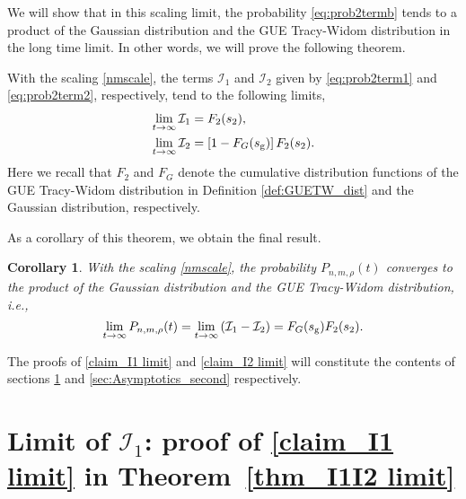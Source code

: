 \documentclass[cmp]{svjour}
\numberwithin{theorem}{section}
\numberwithin{equation}{section}
\newtheorem{corollaryn}[theorem]{Corollary}
\begin{document}
We will show that in this scaling limit, the probability \eqref{eq:prob2termb} tends to a product of the Gaussian distribution and the GUE Tracy-Widom distribution in the long time limit. In other words, we will prove the following theorem.

\medskip

\begin{theorem}
\label{thm_I1I2 limit}
With the scaling \eqref{nmscale}, the terms $\mathcal{I}_1$ and $\mathcal{I}_2$ given by \eqref{eq:prob2term1} and \eqref{eq:prob2term2}, respectively, tend to the following limits,
\begin{subequations}
\begin{align}
\lim_{t \to \infty} \mathcal{I}_1 & = F_2(s_{2}), \label{claim_I1 limit} \\
\lim_{t \to \infty} \mathcal{I}_2 & = \left[ 1 - F_G(s_{{\rm g}}) \right] F_2(s_{2}). \label{claim_I2 limit} 
\end{align}
\end{subequations}
Here we recall that $F_2$ and $F_G$ denote the cumulative distribution functions of the GUE Tracy-Widom distribution in Definition \ref{def:GUETW_dist} and the Gaussian distribution, respectively.
\end{theorem}
As a corollary of this theorem, we obtain the final result.

\medskip

\begin{corollaryn}
\label{cor_Pnm limit}
With the scaling \eqref{nmscale}, the probability $P_{n,m,\rho}(t)$ converges to the product of the Gaussian distribution and the GUE Tracy-Widom distribution, i.e.,
\begin{equation}
\lim_{t \to \infty} P_{n,m,\rho}(t) =  \lim_{t \to \infty} \left( \mathcal{I}_1 - \mathcal{I}_2 \right) = F_G(s_{{\rm g}}) F_2(s_{2}).
\end{equation}
\end{corollaryn}
The proofs of \eqref{claim_I1 limit} and \eqref{claim_I2 limit} will constitute the contents of 
sections \ref{sec: I1 limit} and \ref{sec:Asymptotics_second} respectively. 



\section{Limit of $\mathcal{I}_1$: proof of \eqref{claim_I1 limit} in Theorem~\ref{thm_I1I2 limit} }\label{sec: I1 limit}
\end{document}
